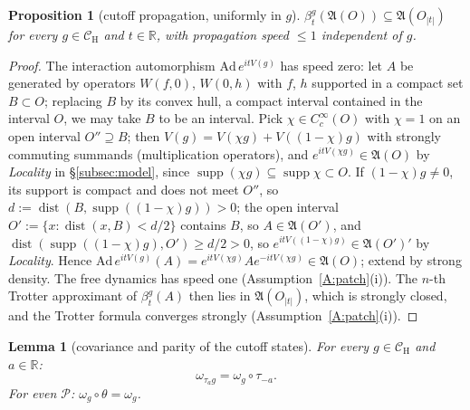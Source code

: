 \documentclass[11pt,a4paper]{article}
\theoremstyle{plain}
\newtheorem{proposition}[theorem]{Proposition}
\newtheorem{lemma}[theorem]{Lemma}
\theoremstyle{definition}
\theoremstyle{plain}
\theoremstyle{definition}
\newcommand{\R}{\mathbb{R}}
\newcommand{\A}{\mathfrak{A}}
\newcommand{\CH}{\mathcal{C}_{\mathrm H}}
\DeclareMathOperator{\supp}{supp}
\DeclareMathOperator{\dist}{dist}
\begin{document}
\begin{proposition}[cutoff propagation, uniformly in $g$]\label{prop:propagation}
$\beta^g_t(\A(O))\subseteq\A(O_{|t|})$ for every $g\in\CH$ and $t\in\R$, with propagation
speed $\le1$ independent of $g$.
\end{proposition}

\begin{proof}
The interaction automorphism $\mathrm{Ad}\,e^{itV(g)}$ has speed zero: let $A$ be generated by
operators $W(f,0)$, $W(0,h)$ with $f$, $h$ supported in a compact set $B\subset O$; replacing
$B$ by its convex hull, a
compact interval contained in the interval $O$, we may take $B$ to be an interval.  Pick
$\chi\in C_c^\infty(O)$ with $\chi=1$ on an open interval $O''\supseteq B$; then
$V(g)=V(\chi g)+V((1-\chi)g)$ with strongly commuting summands (multiplication operators), and
$e^{itV(\chi g)}\in\A(O)$ by \emph{Locality} in \S\ref{subsec:model}, since
$\supp(\chi g)\subseteq\supp\chi\subset O$.  If $(1-\chi)g\ne0$, its support is compact and
does not meet $O''$, so $d:=\dist(B,\supp((1-\chi)g))>0$; the open interval
$O':=\{x:\dist(x,B)<d/2\}$ contains $B$, so $A\in\A(O')$, and
$\dist(\supp((1-\chi)g),O')\ge d/2>0$, so $e^{itV((1-\chi)g)}\in\A(O')'$ by \emph{Locality}.
Hence $\mathrm{Ad}\,e^{itV(g)}(A)=e^{itV(\chi g)}Ae^{-itV(\chi g)}\in\A(O)$; extend by strong
density. The free dynamics has speed
one (Assumption~\ref{A:patch}(i)). The $n$-th Trotter approximant of $\beta^g_t(A)$ then lies
in $\A(O_{|t|})$, which is strongly closed, and the Trotter formula converges strongly
(Assumption~\ref{A:patch}(i)).
\end{proof}

\begin{lemma}[covariance and parity of the cutoff states]\label{lem:covparity}
For every $g\in\CH$ and $a\in\R$:
\begin{equation}
 \omega_{\tau_ag}=\omega_g\circ\tau_{-a} .
 \tag{T}\label{eq:T}
\end{equation}
For even $\mathscr P$: $\omega_g\circ\theta=\omega_g$.
\end{lemma}
\end{document}
